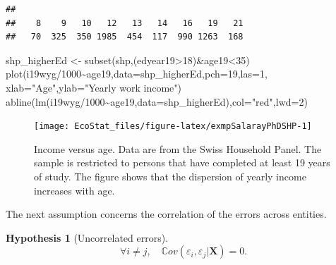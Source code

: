 \documentclass[
  12pt,
]{book}
\newenvironment{Shaded}{\begin{snugshade}}{\end{snugshade}}
\newcommand{\AttributeTok}[1]{\textcolor[rgb]{0.77,0.63,0.00}{#1}}
\newcommand{\DecValTok}[1]{\textcolor[rgb]{0.00,0.00,0.81}{#1}}
\newcommand{\FunctionTok}[1]{\textcolor[rgb]{0.00,0.00,0.00}{#1}}
\newcommand{\NormalTok}[1]{#1}
\newcommand{\OtherTok}[1]{\textcolor[rgb]{0.56,0.35,0.01}{#1}}
\newcommand{\SpecialCharTok}[1]{\textcolor[rgb]{0.00,0.00,0.00}{#1}}
\newcommand{\StringTok}[1]{\textcolor[rgb]{0.31,0.60,0.02}{#1}}
\theoremstyle{definition}
\theoremstyle{definition}
\theoremstyle{definition}
\theoremstyle{definition}
\newtheorem{hypothesis}{Hypothesis}[chapter]
\theoremstyle{remark}
\begin{document}
\begin{Shaded}
\end{Shaded}

\begin{verbatim}
## 
##    8    9   10   12   13   14   16   19   21 
##   70  325  350 1985  454  117  990 1263  168
\end{verbatim}

\begin{Shaded}
\begin{Highlighting}[]
\NormalTok{shp\_higherEd }\OtherTok{\textless{}{-}} \FunctionTok{subset}\NormalTok{(shp,(edyear19}\SpecialCharTok{\textgreater{}}\DecValTok{18}\NormalTok{)}\SpecialCharTok{\&}\NormalTok{age19}\SpecialCharTok{\textless{}}\DecValTok{35}\NormalTok{)}
\FunctionTok{plot}\NormalTok{(i19wyg}\SpecialCharTok{/}\DecValTok{1000}\SpecialCharTok{\textasciitilde{}}\NormalTok{age19,}\AttributeTok{data=}\NormalTok{shp\_higherEd,}\AttributeTok{pch=}\DecValTok{19}\NormalTok{,}\AttributeTok{las=}\DecValTok{1}\NormalTok{,}
     \AttributeTok{xlab=}\StringTok{"Age"}\NormalTok{,}\AttributeTok{ylab=}\StringTok{"Yearly work income"}\NormalTok{)}
\FunctionTok{abline}\NormalTok{(}\FunctionTok{lm}\NormalTok{(i19wyg}\SpecialCharTok{/}\DecValTok{1000}\SpecialCharTok{\textasciitilde{}}\NormalTok{age19,}\AttributeTok{data=}\NormalTok{shp\_higherEd),}\AttributeTok{col=}\StringTok{"red"}\NormalTok{,}\AttributeTok{lwd=}\DecValTok{2}\NormalTok{)}
\end{Highlighting}
\end{Shaded}

\begin{figure}
\texttt{[image: EcoStat\_files/figure-latex/exmpSalarayPhDSHP-1]} \caption{Income versus age. Data are from the Swiss Household Panel. The sample is restricted to persons that have completed at least 19 years of study. The figure shows that the dispersion of yearly income increases with age.}\label{fig:exmpSalarayPhDSHP}
\end{figure}

The next assumption concerns the correlation of the errors across entities.

\begin{hypothesis}[Uncorrelated errors]
\protect\hypertarget{hyp:noncorrelResid}{}\label{hyp:noncorrelResid}\[
\forall i \ne j, \quad \mathbb{C}ov(\varepsilon_i,\varepsilon_j|\mathbf{X})=0.
\]
\end{hypothesis}
\end{document}
